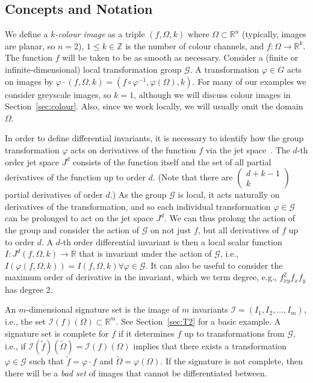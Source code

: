 \documentclass[review,onefignum,onetabnum]{siamonline190516}
\def\R{\mathbb{R}}
\begin{document}
\subsection{Concepts and Notation}

We define a {\em $k$-colour image} as a triple $(f,\Omega,k)$ where $\Omega\subset\R^n$ (typically, images are planar, so $n=2$), $1\le k\in\mathbb{Z}$ is the number of colour channels, and $f\colon\Omega\to\R^k$. The function $f$ will be taken to be as smooth as necessary. Consider a (finite or infinite-dimensional) local transformation group $\mathcal{G}$.  A transformation $\varphi\in G$ acts on images by $\varphi\cdot (f,\Omega,k) = (f\circ\varphi^{-1},\varphi(\Omega),k)$. For many of our examples we consider greyscale images, so $k=1$, although we will discuss colour images in Section~\ref{sec:colour}. Also, since we work locally, we will usually omit the domain $\Omega$.

In order to define differential invariants, it is necessary to identify how the group transformation $\varphi$ acts on derivatives of the function $f$ via the jet space~\cite{OlverEIS}. The $d$-th order jet space $J^d$ consists of the function itself and the set of all partial derivatives of the function up to order $d$. (Note that there are $\left( \begin{array}{c} d+k-1 \\ k \end{array} \right)$ partial derivatives of order $d$.) As the group $\mathcal{G}$ is local, it acts naturally on derivatives of the transformation, and so each individual transformation $\varphi \in \mathcal{G}$ can be prolonged to act on the jet space $J^d$. We can thus prolong the action of the group and consider the action of $\mathcal{G}$ on not just $f$, but all derivatives of $f$ up to order $d$. A $d$-th order differential invariant is then a local scalar function $I: J^{d} (f,\Omega, k) \to \mathbb{R}$ that is invariant under the action of $\mathcal{G}$, i.e., $I(\varphi(f,\Omega, k)) = I(f, \Omega, k) \forall \varphi \in \mathcal{G}$. It can also be useful to consider the maximum order of derivative in the invariant, which we term degree, e.g., $f_{xy}^2 f_x f_y$ has degree 2. 

An $m$-dimensional signature set is the image of $m$ invariants $\mathcal{I}=(I_1,I_2,\dots,I_m)$, i.e., the set $\mathcal{I}(f)(\Omega)\subset \mathbb{R}^m$. See Section~\ref{sec:T2} for a basic example.  A signature set is complete for $f$ if it determines $f$ up to transformations from $\mathcal{G}$, i.e., if $\mathcal{I}(\tilde f)(\tilde\Omega) = \mathcal{I}(f)(\Omega)$ implies that there exists a transformation $\varphi\in \mathcal{G}$ such that $\tilde f = \varphi\cdot f$ and $\tilde \Omega = \varphi(\Omega)$. If the signature is not complete, then there will be a \emph{bad set} of images that cannot be differentiated between. 
\end{document}
